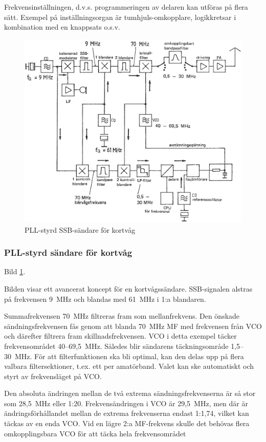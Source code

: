 Frekvensinställningen, d.v.s. programmeringen av delaren kan utföras
på flera sätt. Exempel på inställningsorgan är tumhjuls-omkopplare,
logikkretsar i kombination med en knappsats o.s.v.

\begin{figure}
  \includegraphics[width=\textwidth]{images/cropped_pdfs/bild_2_5-08.pdf}
  \caption{PLL-styrd SSB-sändare för kortvåg}
  \label{fig:bildII5-8}
\end{figure}

\subsubsection{PLL-styrd sändare för kortvåg}

Bild \ref{fig:bildII5-8}.

Bilden visar ett avancerat koncept för en kortvågssändare.
SSB-signalen alstras på frekvensen 9~MHz och blandas med 61~MHz i 1:a
blandaren.

Summafrekvensen 70~MHz filtreras fram som mellanfrekvens. Den önskade
sändningsfrekvensen fås genom att blanda 70~MHz MF med frekvensen från
VCO och därefter filtrera fram skillnadsfrekvensen.  VCO i detta
exempel täcker frekvensområdet 40--69,5~MHz. Således blir sändarens
täckningsområde 1,5--30~MHz. För att filterfunktionen ska bli
optimal, kan den delas upp på flera valbara filtersektioner, t.ex. ett
per amatörband. Valet kan ske automatiskt och styrt av frekvensläget
på VCO.

Den absoluta ändringen mellan de två extrema sändningsfrekvenserna är
så stor som 28,5~MHz eller 1:20. Frekvensändringen i VCO är 29,5~MHz,
men där är ändringsförhållandet mellan de extrema frekvenserna endast
1:1,74, vilket kan täckas av en enda VCO. Vid en lägre 2:a MF-frekvens
skulle det behövas flera omkopplingsbara VCO för att täcka hela
frekvensområdet

